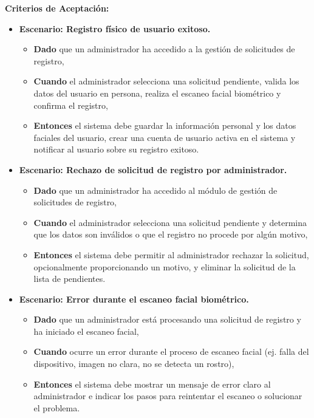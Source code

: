 \documentclass[12pt]{article}
\begin{document}
\textbf{Criterios de Aceptación:}
\begin{itemize}
	\item \textbf{Escenario: Registro físico de usuario exitoso.}
	\begin{itemize}
		\item \textbf{Dado} que un administrador ha accedido a la gestión de solicitudes de registro,
		\item \textbf{Cuando} el administrador selecciona una solicitud pendiente, valida los datos del usuario en persona, realiza el escaneo facial biométrico y confirma el registro,
		\item \textbf{Entonces} el sistema debe guardar la información personal y los datos faciales del usuario, crear una cuenta de usuario activa en el sistema y notificar al usuario sobre su registro exitoso.
	\end{itemize}

	\item \textbf{Escenario: Rechazo de solicitud de registro por administrador.}
	\begin{itemize}
		\item \textbf{Dado} que un administrador ha accedido al módulo de gestión de solicitudes de registro,
		\item \textbf{Cuando} el administrador selecciona una solicitud pendiente y determina que los datos son inválidos o que el registro no procede por algún motivo,
		\item \textbf{Entonces} el sistema debe permitir al administrador rechazar la solicitud, opcionalmente proporcionando un motivo, y eliminar la solicitud de la lista de pendientes.
	\end{itemize}

	\item \textbf{Escenario: Error durante el escaneo facial biométrico.}
	\begin{itemize}
		\item \textbf{Dado} que un administrador está procesando una solicitud de registro y ha iniciado el escaneo facial,
		\item \textbf{Cuando} ocurre un error durante el proceso de escaneo facial (ej. falla del dispositivo, imagen no clara, no se detecta un rostro),
		\item \textbf{Entonces} el sistema debe mostrar un mensaje de error claro al administrador e indicar los pasos para reintentar el escaneo o solucionar el problema.
	\end{itemize}


\end{itemize}
\end{document}
